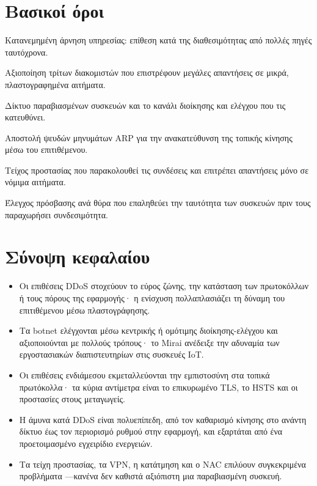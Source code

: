 \section*{Βασικοί όροι}
\begin{description}[style=nextline,leftmargin=1.2em]
  \item[DDoS] Κατανεμημένη άρνηση υπηρεσίας: επίθεση κατά της διαθεσιμότητας από πολλές πηγές ταυτόχρονα.
  \item[Ενίσχυση] Αξιοποίηση τρίτων διακομιστών που επιστρέφουν μεγάλες απαντήσεις σε μικρά, πλαστογραφημένα αιτήματα.
  \item[Botnet / C2] Δίκτυο παραβιασμένων συσκευών και το κανάλι διοίκησης και ελέγχου που τις κατευθύνει.
  \item[Πλαστογράφηση ARP] Αποστολή ψευδών μηνυμάτων ARP για την ανακατεύθυνση της τοπικής κίνησης μέσω του επιτιθέμενου.
  \item[Τείχος προστασίας με κατάσταση] Τείχος προστασίας που παρακολουθεί τις συνδέσεις και επιτρέπει απαντήσεις μόνο σε νόμιμα αιτήματα.
  \item[802.1X] Έλεγχος πρόσβασης ανά θύρα που επαληθεύει την ταυτότητα των συσκευών πριν τους παραχωρήσει συνδεσιμότητα.
\end{description}

\section*{Σύνοψη κεφαλαίου}
\begin{itemize}
  \item Οι επιθέσεις DDoS στοχεύουν το εύρος ζώνης, την κατάσταση των πρωτοκόλλων ή τους πόρους της εφαρμογής· η ενίσχυση πολλαπλασιάζει τη δύναμη του επιτιθέμενου μέσω πλαστογράφησης.
  \item Τα botnet ελέγχονται μέσω κεντρικής ή ομότιμης διοίκησης-ελέγχου και αξιοποιούνται με πολλούς τρόπους· το Mirai ανέδειξε την αδυναμία των εργοστασιακών διαπιστευτηρίων στις συσκευές IoT.
  \item Οι επιθέσεις ενδιάμεσου εκμεταλλεύονται την εμπιστοσύνη στα τοπικά πρωτόκολλα· τα κύρια αντίμετρα είναι το επικυρωμένο TLS, το HSTS και οι προστασίες στους μεταγωγείς.
  \item Η άμυνα κατά DDoS είναι πολυεπίπεδη, από τον καθαρισμό κίνησης στο ανάντη δίκτυο έως τον περιορισμό ρυθμού στην εφαρμογή, και εξαρτάται από ένα προετοιμασμένο εγχειρίδιο ενεργειών.
  \item Τα τείχη προστασίας, τα VPN, η κατάτμηση και ο NAC επιλύουν συγκεκριμένα προβλήματα —κανένα δεν καθιστά αξιόπιστη μια παραβιασμένη συσκευή.
\end{itemize}

